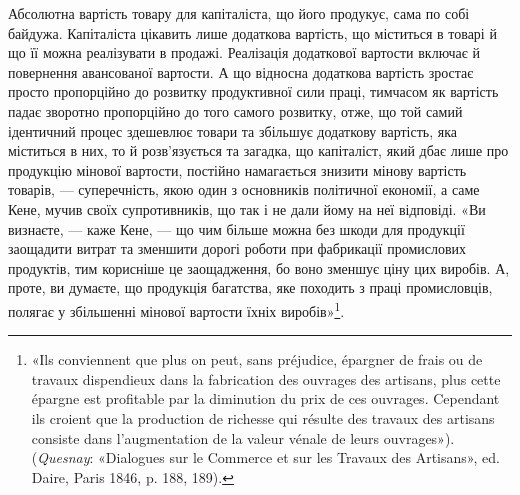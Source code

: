 Абсолютна вартість товару для капіталіста, що його продукує, сама по собі
байдужа. Капіталіста цікавить лише додаткова
вартість, що міститься в товарі й що її можна реалізувати в продажі. Реалізація
додаткової вартости включає й повернення авансованої вартости. А що відносна
додаткова вартість зростає просто пропорційно до розвитку продуктивної сили
праці, тимчасом як вартість падає зворотно пропорційно до того самого розвитку,
отже, що той самий ідентичний процес здешевлює товари та збільшує додаткову
вартість, яка міститься в них, то й розв’язується
та загадка, що капіталіст, який дбає лише про продукцію мінової
вартости, постійно намагається знизити мінову вартість товарів, —
суперечність, якою один з основників політичної економії, а
саме Кене, мучив своїх супротивників, що так і не дали йому на
неї відповіді. «Ви визнаєте, — каже Кене, — що чим більше
можна без шкоди для продукції заощадити витрат та зменшити
дорогі роботи при фабрикації промислових продуктів, тим корисніше
це заощадження, бо воно зменшує ціну цих виробів. А, проте,
ви думаєте, що продукція багатства, яке походить з праці промисловців, полягає у
збільшенні мінової вартости їхніх виробів»\footnote{
«Іls conviennent que plus on peut, sans préjudice, épargner de frais ou
de travaux dispendieux dans la fabrication des ouvrages des artisans, plus
cette épargne est profitable par la diminution du prix de ces ouvrages.
Cependant ils croient que la production de richesse qui résulte des travaux
des artisans consiste dans l’augmentation de la valeur vénale de leurs ouvrages»).
(\emph{Quesnay}: «Dialogues sur le Commerce et sur les Travaux des
Artisans», ed. Daire, Paris 1846, p. 188, 189).
}.

